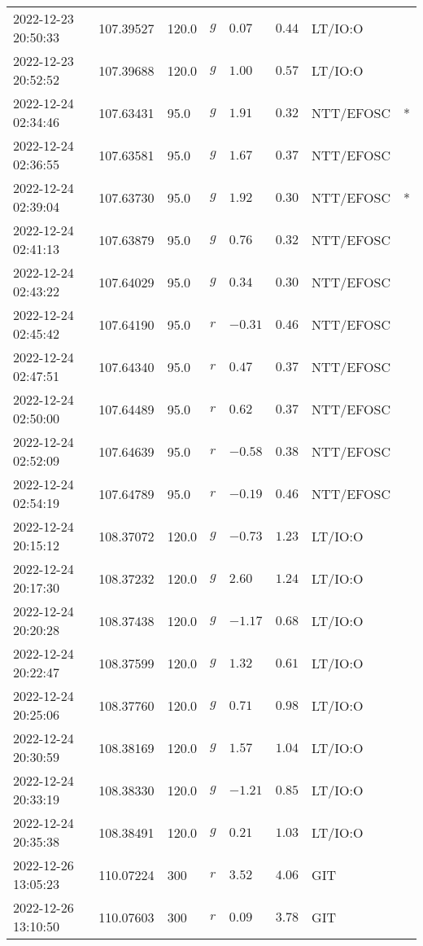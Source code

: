 \documentclass{nature_plusfigure}
\begin{document}
\begin{supplement}
\begin{center}
\begin{longtable}{llllllll}
2022-12-23 20:50:33 & 107.39527 & 120.0 & $g$ & $0.07$ & $0.44$ & LT/IO:O &  \\ 
2022-12-23 20:52:52 & 107.39688 & 120.0 & $g$ & $1.00$ & $0.57$ & LT/IO:O &  \\ 
2022-12-24 02:34:46 & 107.63431 & 95.0 & $g$ & $1.91$ & $0.32$ & NTT/EFOSC & * \\ 
2022-12-24 02:36:55 & 107.63581 & 95.0 & $g$ & $1.67$ & $0.37$ & NTT/EFOSC &  \\ 
2022-12-24 02:39:04 & 107.63730 & 95.0 & $g$ & $1.92$ & $0.30$ & NTT/EFOSC & * \\ 
2022-12-24 02:41:13 & 107.63879 & 95.0 & $g$ & $0.76$ & $0.32$ & NTT/EFOSC &  \\ 
2022-12-24 02:43:22 & 107.64029 & 95.0 & $g$ & $0.34$ & $0.30$ & NTT/EFOSC &  \\ 
2022-12-24 02:45:42 & 107.64190 & 95.0 & $r$ & $-0.31$ & $0.46$ & NTT/EFOSC &  \\ 
2022-12-24 02:47:51 & 107.64340 & 95.0 & $r$ & $0.47$ & $0.37$ & NTT/EFOSC &  \\ 
2022-12-24 02:50:00 & 107.64489 & 95.0 & $r$ & $0.62$ & $0.37$ & NTT/EFOSC &  \\ 
2022-12-24 02:52:09 & 107.64639 & 95.0 & $r$ & $-0.58$ & $0.38$ & NTT/EFOSC &  \\ 
2022-12-24 02:54:19 & 107.64789 & 95.0 & $r$ & $-0.19$ & $0.46$ & NTT/EFOSC &  \\ 
2022-12-24 20:15:12 & 108.37072 & 120.0 & $g$ & $-0.73$ & $1.23$ & LT/IO:O &  \\ 
2022-12-24 20:17:30 & 108.37232 & 120.0 & $g$ & $2.60$ & $1.24$ & LT/IO:O &  \\ 
2022-12-24 20:20:28 & 108.37438 & 120.0 & $g$ & $-1.17$ & $0.68$ & LT/IO:O &  \\ 
2022-12-24 20:22:47 & 108.37599 & 120.0 & $g$ & $1.32$ & $0.61$ & LT/IO:O &  \\ 
2022-12-24 20:25:06 & 108.37760 & 120.0 & $g$ & $0.71$ & $0.98$ & LT/IO:O &  \\ 
2022-12-24 20:30:59 & 108.38169 & 120.0 & $g$ & $1.57$ & $1.04$ & LT/IO:O &  \\ 
2022-12-24 20:33:19 & 108.38330 & 120.0 & $g$ & $-1.21$ & $0.85$ & LT/IO:O &  \\ 
2022-12-24 20:35:38 & 108.38491 & 120.0 & $g$ & $0.21$ & $1.03$ & LT/IO:O &  \\ 
2022-12-26 13:05:23 & 110.07224 & 300 & $r$ & $3.52$ & $4.06$ & GIT &  \\ 
2022-12-26 13:10:50 & 110.07603 & 300 & $r$ & $0.09$ & $3.78$ & GIT &  \\ 

\end{longtable}
\end{center}
\end{supplement}
\end{document}
